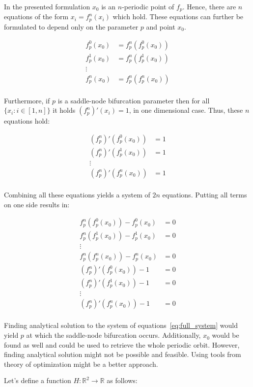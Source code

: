 In the presented formulation $x_0$ is an $n$-periodic point of $f_{p}$.
Hence, there are $n$ equations of the form $x_i = f_{p}^{n}(x_i)$ which hold.
These equations can further be formulated to depend only on the parameter $p$ and point $x_0$.

\begin{align*} 
f_{p}^{0}(x_0) &= f_{p}^{n}(f_{p}^{0}(x_0)) \\
f_{p}^{1}(x_0) &= f_{p}^{n}(f_{p}^{1}(x_0)) \\
\vdots \\
f_{p}^{n}(x_0) &= f_{p}^{n}(f_{p}^{n}(x_0)) \\
\end{align*}

Furthermore, if $p$ is a saddle-node bifurcation parameter then for all $\{ x_{i}: i \in [1, n] \}$ it holds $(f_{p}^{n})'(x_i) = 1$, in one dimensional case.
Thus, these $n$ equations hold:

\begin{align*} 
(f_{p}^{n})'(f_{p}^{0}(x_0)) &= 1 \\
(f_{p}^{n})'(f_{p}^{1}(x_0)) &= 1 \\
\vdots \\
(f_{p}^{n})'(f_{p}^{n}(x_0)) &= 1 \\
\end{align*}

Combining all these equations yields a system of $2n$ equations.
Putting all terms on one side results in:

\begin{equation}
\label{eq:full_system}
\begin{aligned} 
f_{p}^{n}(f_{p}^{0}(x_0)) - f_{p}^{0}(x_0) &= 0 \\
f_{p}^{n}(f_{p}^{1}(x_0)) - f_{p}^{1}(x_0) &= 0 \\
\vdots \\
f_{p}^{n}(f_{p}^{n}(x_0)) - f_{p}^{n}(x_0) &= 0 \\
(f_{p}^{n})'(f_{p}^{0}(x_0)) - 1 &= 0 \\
(f_{p}^{n})'(f_{p}^{1}(x_0)) - 1 &= 0 \\
\vdots \\
(f_{p}^{n})'(f_{p}^{n}(x_0)) - 1 &= 0 \\
\end{aligned}
\end{equation}

Finding analytical solution to the system of equations~\eqref{eq:full_system} would yield $p$ at which the saddle-node bifurcation occurs.
Additionally, $x_0$ would be found as well and could be used to retrieve the whole periodic orbit.
However, finding analytical solution might not be possible and feasible.
Using tools from theory of optimization might be a better approach.
\par
Let's define a function $H: \mathbb{R}^{2} \rightarrow \mathbb{R}$ as follows:

